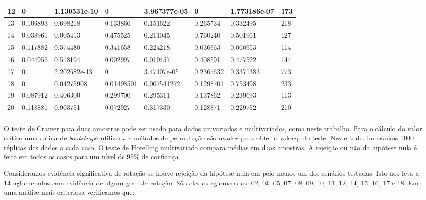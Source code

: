 \begin{table}[H]
{\begin{tabular}{|l|l|l|l|l|l|l|l|}
                   12  &  {\color{red}0}  & {\color{red}1.130531e-10} & {\color{red}0} & 	3.967377e-05 &	{\color{red}0} &	1.773186e-07 &	173 \\ \hline
                   13  &  0.106893 & 0.698218 &	0.133866 &	0.151622 & 0.265734 & 0.332495 & 218 \\ \hline
                   14  &  {\color{red}0.038961} & 0.005413 &	0.475525 &  0.211045 & 0.760240 & 0.501961 & 127 \\ \hline
                   15  &  0.117882 & 0.574480 &	0.341658 &	0.224218 & {\color{red}0.036963} & 0.060953 & 114 \\ \hline
                   16  &  {\color{red}0.044955} & 0.518194 &	{\color{red}0.002997} &  {\color{red}0.019457} & 0.408591 & 0.477522 & 144  \\ \hline
                   17  &  {\color{red}0}  & {\color{red}2.202682e-13} & {\color{red}0} &  3.47107e-05 & 0.2367632 & 0.3371383 & 773 \\ \hline
                   18  &  {\color{red}0} & {\color{red}0.04275908} & {\color{red}0.01498501} &  {\color{red}0.007541272} & 0.1298701 & 0.753498 & 233 \\ \hline
                   19  &  0.087912 & 0.406300 &	0.299700 &	0.295311 & 0.137862 & 0.239693 & 113 \\ \hline
                   20  &  0.118881 & 0.903751 &	0.072927 &	0.317330 & 0.128871 & 0.229752 & 210 \\ \hline
\label{tab:selec20T}
\end{tabular}
}
\end{table}

O teste de Cramer para duas amostras pode ser usado para dados univariados e multivariados, como neste trabalho. Para o cálculo do valor crítico uma rotina de \textit{bootstrap}é utilizada e métodos de permutação são usados para obter o valor-p do teste. Neste trabalho usamos 1000 réplicas dos dados a cada caso. O teste de Hotelling multivariado compara médias em duas amostras. A rejeição ou não da hipótese nula é feita em todos os casos para um nível de 95\% de confiança. 

Consideramos evidência significativa de rotação se houve rejeição da hipótese nula em pelo menos um dos cenários testadas. Isto nos leva a 14 aglomerados com evidência de algum grau de rotação. São eles os aglomerados: 02, 04, 05, 07, 08, 09, 10, 11, 12, 14, 15, 16, 17 e 18. Em uma análise mais criteriosa verificamos que:

